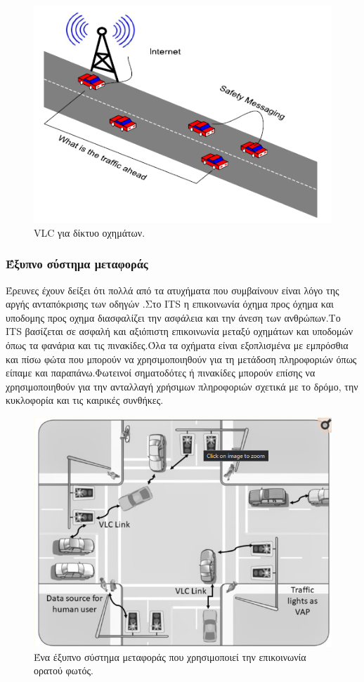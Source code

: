 \documentclass[conference]{IEEEtran}
\begin{document}
\begin{figure}[h]
  \includegraphics[width=\linewidth]{2.png}
  \caption{VLC για δίκτυο οχημάτων.} 
\end{figure}

\subsubsection{Έξυπνο σύστημα μεταφοράς \cite{b6}}
Έρευνες έχουν δείξει ότι πολλά από τα ατυχήματα που συμβαίνουν είναι λόγο της αργής ανταπόκρισης των οδηγών .Στο ITS  η επικοινωνία όχημα προς όχημα και υποδομης προς οχημα διασφαλίζει την ασφάλεια  και την άνεση των ανθρώπων.Το ΙΤS βασίζεται σε ασφαλή  και αξιόπιστη  επικοινωνία μεταξύ οχημάτων και υποδομών όπως  τα φανάρια και τις  πινακίδες.Όλα τα οχήματα είναι εξοπλισμένα με εμπρόσθια και πίσω φώτα που μπορούν να χρησιμοποιηθούν για τη μετάδοση πληροφοριών όπως είπαμε και παραπάνω.Φωτεινοί σηματοδότες ή πινακίδες μπορούν επίσης να χρησιμοποιηθούν για την ανταλλαγή χρήσιμων πληροφοριών σχετικά με το δρόμο, την κυκλοφορία και τις καιρικές συνθήκες.

\begin{figure}[h]
  \includegraphics[width=\linewidth]{8.png}
  \caption{Ένα έξυπνο σύστημα μεταφοράς που χρησιμοποιεί την επικοινωνία ορατού φωτός.} 
\end{figure}
\end{document}
